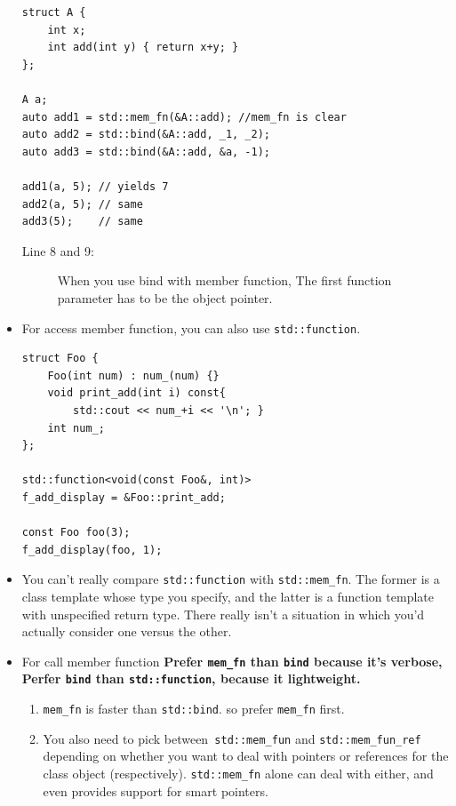 \documentclass[a4paper,11pt,twoside]{book}
\begin{document}
\begin{itemize}
\begin{lstlisting}
struct A { 
	int x;
	int add(int y) { return x+y; }
};

A a;
auto add1 = std::mem_fn(&A::add); //mem_fn is clear
auto add2 = std::bind(&A::add, _1, _2); 
auto add3 = std::bind(&A::add, &a, -1);

add1(a, 5); // yields 7
add2(a, 5); // same
add3(5);    // same
\end{lstlisting}
\begin{description}
	\item[Line 8 and 9:] When you use bind with member function, The first function parameter has to be the object pointer.
\end{description}

\item For access member function, you can also use \texttt{std::function}.

\begin{lstlisting}[numbers=none]
struct Foo {
	Foo(int num) : num_(num) {}
	void print_add(int i) const{
		std::cout << num_+i << '\n'; }
	int num_;
};

std::function<void(const Foo&, int)> 
f_add_display = &Foo::print_add;

const Foo foo(3);
f_add_display(foo, 1); 	
\end{lstlisting}		

	\item You can't really compare \texttt{std::function} with \texttt{std::mem\_fn}. The former is a class template whose type you specify, and the latter is a function template with unspecified return type. There really isn't a situation in which you'd actually consider one versus the other.

	\item For call member function \textbf{Prefer \texttt{mem\_fn} than \texttt{bind} because it's verbose, Perfer \texttt{bind}  than \texttt{std::function}, because it lightweight.}

\begin{enumerate}
	\item \texttt{mem\_fn} is faster than \texttt{std::bind}.  so prefer \texttt{mem\_fn} first.
	
	\item You also need to pick between\texttt{ std::mem\_fun} and \texttt{std::mem\_fun\_ref} depending on whether you want to deal with pointers or references for the class object (respectively). \texttt{std::mem\_fn} alone can deal with either, and even provides support for smart pointers.
\end{enumerate}




\end{itemize}
\end{document}
